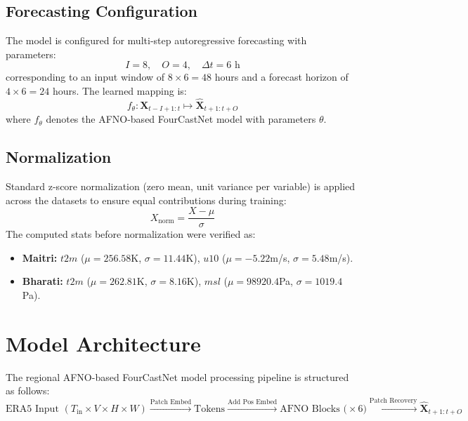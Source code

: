 \documentclass[12pt,titlepage,a4paper]{report}
\begin{document}
\section{Forecasting Configuration}
The model is configured for multi-step autoregressive forecasting with parameters:
\begin{equation}
    I = 8, \quad O = 4, \quad \Delta t = 6\text{ h}
\end{equation}
corresponding to an input window of $8 \times 6 = 48$ hours and a forecast horizon of $4 \times 6 = 24$ hours. The learned mapping is:
\begin{equation}
    f_\theta : \mathbf{X}_{t-I+1:t} \mapsto \hat{\mathbf{X}}_{t+1:t+O}
\end{equation}
where $f_\theta$ denotes the AFNO-based FourCastNet model with parameters $\theta$.

\section{Normalization}
Standard z-score normalization (zero mean, unit variance per variable) is applied across the datasets to ensure equal contributions during training:
\begin{equation}
    X_{\text{norm}} = \frac{X - \mu}{\sigma}
\end{equation}
The computed stats before normalization were verified as:
\begin{itemize}
    \item \textbf{Maitri:} $t2m$ ($\mu=256.58$K, $\sigma=11.44$K), $u10$ ($\mu=-5.22$m/s, $\sigma=5.48$m/s).
    \item \textbf{Bharati:} $t2m$ ($\mu=262.81$K, $\sigma=8.16$K), $msl$ ($\mu=98920.4$Pa, $\sigma=1019.4$Pa).
\end{itemize}

\chapter{Model Architecture}
The regional AFNO-based FourCastNet model processing pipeline is structured as follows:
\begin{equation}
    \text{ERA5 Input } (T_{\text{in}} \times V \times H \times W) \xrightarrow{\text{Patch Embed}} \text{Tokens} \xrightarrow{\text{Add Pos Embed}} \text{AFNO Blocks (}\times 6\text{)} \xrightarrow{\text{Patch Recovery}} \hat{\mathbf{X}}_{t+1:t+O}
\end{equation}
\end{document}
